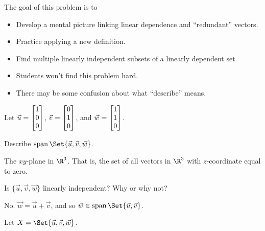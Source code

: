 	\bookonlynewpage

	\question
	\begin{annotation}
		\begin{goals}

			The goal of this problem is to
			\begin{itemize}
				\item Develop a mental picture linking linear dependence and
					``redundant'' vectors.
				\item Practice applying a new definition.
				\item Find multiple linearly independent subsets of a linearly dependent set.
			\end{itemize}
		\end{goals}

		\begin{notes}
			\begin{itemize}
				\item Students won't find this problem hard.
				\item There may be some confusion about what ``describe'' means.
			\end{itemize}
		\end{notes}
	\end{annotation}
		Let $\vec u=\mat{1\\0\\0}$, $\vec v=\mat{0\\1\\0}$, and $\vec w=\mat{1\\1\\0}$.
	\begin{parts}
		\item Describe $\Span\Set{\vec u,\vec v,\vec w}$.
			\begin{solution}
				The $xy$-plane in $\R^3$. That is, the set of all vectors in $\R^3$ with $z$-coordinate
				equal to zero.
			\end{solution}
		\item Is $\{\vec u,\vec v,\vec w\}$ linearly independent? Why or why not?
			\begin{solution}
				No. $\vec w=\vec u+\vec v$, and so $\vec w \in \Span\Set{\vec u, \vec v}$.
			\end{solution}
	\end{parts}

	Let $X=\Set{\vec u,\vec v,\vec w}$.

